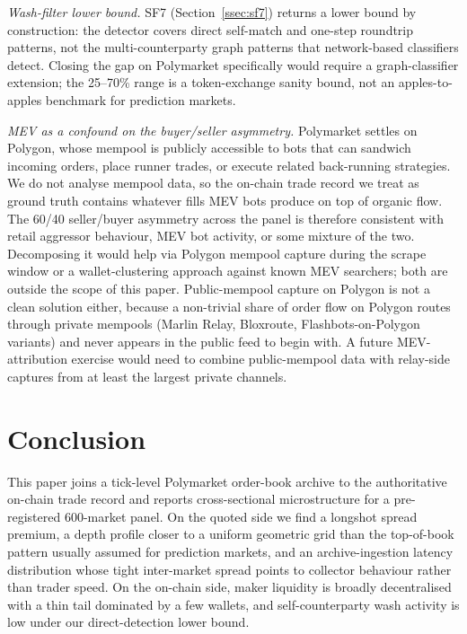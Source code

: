 \documentclass[11pt,a4paper,twocolumn]{article}
\begin{document}
\textit{Wash-filter lower bound.}
SF7 (Section~\ref{ssec:sf7}) returns a lower bound by construction:
the detector covers direct self-match and one-step roundtrip
patterns, not the multi-counterparty graph patterns that
network-based classifiers detect. Closing the gap on Polymarket
specifically would require a graph-classifier extension; the
\citet{cong-li-tang-yang-2023} 25--70\% range is a token-exchange sanity
bound, not an apples-to-apples benchmark for prediction markets.

\textit{MEV as a confound on the buyer/seller asymmetry.}
Polymarket settles on Polygon, whose mempool is publicly accessible
to bots that can sandwich incoming orders, place runner trades, or
execute related back-running strategies. We do not analyse mempool
data, so the on-chain trade record we treat as ground truth
contains whatever fills MEV bots produce on top of organic flow.
The 60/40 seller/buyer asymmetry across the panel is therefore
consistent with retail aggressor behaviour, MEV bot activity, or
some mixture of the two. Decomposing it would help via Polygon
mempool capture during the scrape window or a wallet-clustering
approach against known MEV searchers; both are outside the scope
of this paper. Public-mempool capture on Polygon is not a clean
solution either, because a non-trivial share of order flow on
Polygon routes through private mempools (Marlin Relay, Bloxroute,
Flashbots-on-Polygon variants) and never appears in the public feed
to begin with. A future MEV-attribution exercise would need to
combine public-mempool data with relay-side captures from at least
the largest private channels.
\section{Conclusion}\label{sec:conclusion}

This paper joins a tick-level Polymarket order-book archive to the
authoritative on-chain trade record and reports cross-sectional
microstructure for a pre-registered 600-market panel. On the quoted
side we find a longshot spread premium, a depth profile closer to a
uniform geometric grid than the top-of-book pattern usually assumed
for prediction markets, and an archive-ingestion latency distribution
whose tight inter-market spread points to collector behaviour rather
than trader speed. On the on-chain side, maker liquidity is broadly
decentralised with a thin tail dominated by a few wallets, and
self-counterparty wash activity is low under our direct-detection
lower bound.
\end{document}
